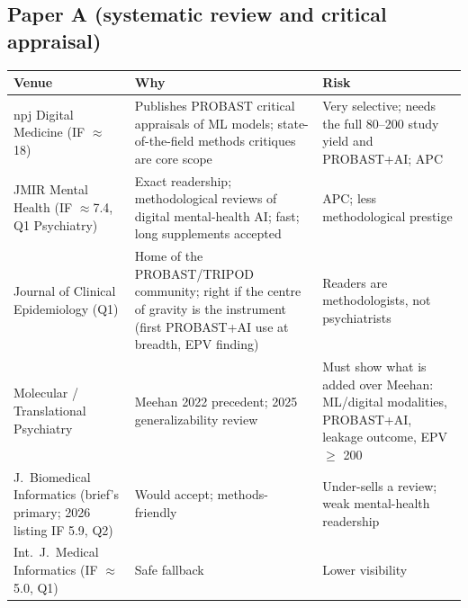 \documentclass[11pt,a4paper]{article}
\begin{document}
\subsection{Paper A (systematic review and critical appraisal)}
\begin{tabularx}{\linewidth}{@{}>{\RaggedRight}p{3.4cm} L L@{}}
\toprule
\textbf{Venue} & \textbf{Why} & \textbf{Risk}\\
\midrule
npj Digital Medicine (IF $\approx$18) & Publishes PROBAST critical appraisals of ML models; state-of-the-field methods critiques are core scope & Very selective; needs the full 80--200 study yield and PROBAST+AI; APC\\
JMIR Mental Health (IF $\approx$7.4, Q1 Psychiatry) & Exact readership; methodological reviews of digital mental-health AI; fast; long supplements accepted & APC; less methodological prestige\\
Journal of Clinical Epidemiology (Q1) & Home of the PROBAST/TRIPOD community; right if the centre of gravity is the instrument (first PROBAST+AI use at breadth, EPV finding) & Readers are methodologists, not psychiatrists\\
Molecular / Translational Psychiatry & Meehan 2022 precedent; 2025 generalizability review & Must show what is added over Meehan: ML/digital modalities, PROBAST+AI, leakage outcome, EPV $\geq$ 200\\
J.\ Biomedical Informatics (brief's primary; 2026 listing IF 5.9, Q2) & Would accept; methods-friendly & Under-sells a review; weak mental-health readership\\
Int.\ J.\ Medical Informatics (IF $\approx$5.0, Q1) & Safe fallback & Lower visibility\\
\bottomrule
\end{tabularx}
\end{document}
